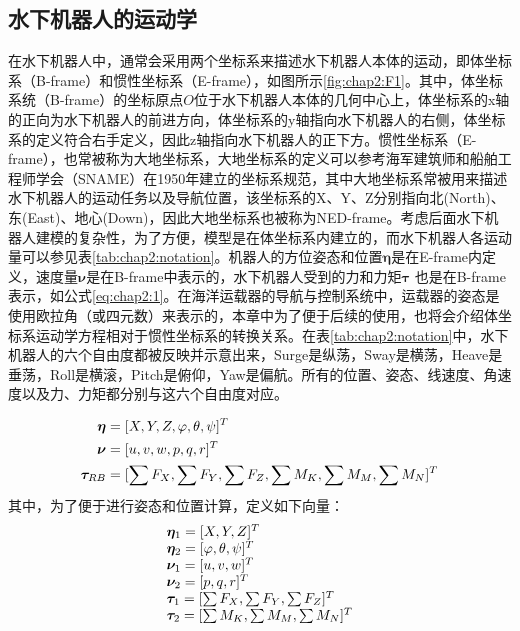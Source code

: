 \subsection{水下机器人的运动学 }

在水下机器人中，通常会采用两个坐标系来描述水下机器人本体的运动，即体坐标系（B-frame）和惯性坐标系（E-frame），如图所示\ref{fig:chap2:F1}。其中，体坐标系统（B-frame）的坐标原点$O$位于水下机器人本体的几何中心上，体坐标系的x轴的正向为水下机器人的前进方向，体坐标系的y轴指向水下机器人的右侧，体坐标系的定义符合右手定义，因此z轴指向水下机器人的正下方。惯性坐标系（E-frame），也常被称为大地坐标系，大地坐标系的定义可以参考海军建筑师和船舶工程师学会（SNAME）在1950年建立的坐标系规范，其中大地坐标系常被用来描述水下机器人的运动任务以及导航位置，该坐标系的X、Y、Z分别指向北(North)、东(East)、地心(Down)，因此大地坐标系也被称为NED-frame\cite{fossen1994guidance}。考虑后面水下机器人建模的复杂性，为了方便，模型是在体坐标系内建立的，而水下机器人各运动量可以参见表\ref{tab:chap2:notation}。机器人的方位姿态和位置$\bm \eta$是在E-frame内定义，速度量$\bm \nu$是在B-frame中表示的，水下机器人受到的力和力矩$\bm \tau$ 也是在B-frame表示，如公式\ref{eq:chap2:1}。在海洋运载器的导航与控制系统中，运载器的姿态是使用欧拉角（或四元数）来表示的，本章中为了便于后续的使用，也将会介绍体坐标系运动学方程相对于惯性坐标系的转换关系。在表\ref{tab:chap2:notation}中，水下机器人的六个自由度都被反映并示意出来，Surge是纵荡，Sway是横荡，Heave是垂荡，Roll是横滚，Pitch是俯仰，Yaw是偏航。所有的位置、姿态、线速度、角速度以及力、力矩都分别与这六个自由度对应。



\begin{equation}
\centering
\label{eq:chap2:1}
\begin{aligned}
 {\bm{\eta}}  &= {[X,Y,Z,\varphi ,\theta ,\psi ]^T} \\
 {\bm{\nu}} &= {[u,v,w,p,q,r]^T} \\
 {\bm{\tau}_{RB}} &= {[ \sum {F_X}, \sum {F_Y}, \sum {F_Z}, \sum {M_K}, \sum {M_M}, \sum {M_N}]^T}\\
 \end{aligned}
 \end{equation}
 其中，为了便于进行姿态和位置计算，定义如下向量：
 \begin{equation*}
 \centering
 \label{eq:chap2:2}
 \begin{array}{l}
 {{\bm{\eta}} _1} = {[X,Y,Z]^T} \\
 {{\bm{\eta}} _2} = {[\varphi ,\theta ,\psi ]^T}\\
 {{\bm{\nu}} _1}= {[u,v,w]^T}\\
 {{\bm{\nu}} _2}= {[p,q,r]^T}\\
 {{\bm{\tau}}_1} = {[ \sum {F_X}, \sum {F_Y}, \sum {F_Z}]^T}\\
 {{\bm{\tau}}_2} = {[ \sum {M_K}, \sum {M_M}, \sum {M_N}]^T}\\
 \end{array}
 \end{equation*}



